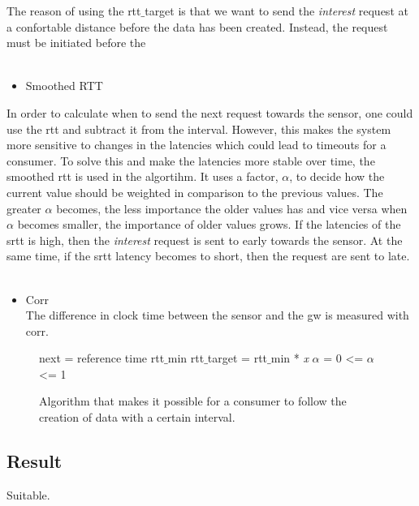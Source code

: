 The reason of using the rtt$\_$target is that we want to send the \textit{interest} request at a confortable distance before the data has been created.
Instead, the request must be initiated before the\\\\
\begin{itemize}
\item Smoothed RTT
\end{itemize}
In order to calculate when to send the next request towards the sensor, one could use the rtt and subtract it from the interval. 
However, this makes the system more sensitive to changes in the latencies which could lead to timeouts for a consumer. To solve this and make the latencies more stable over time, the smoothed rtt is used in the algortihm. It uses a factor, $\alpha$, to decide how the current value should be weighted in comparison to the previous values. The greater $\alpha$ becomes, the less importance the older values has and vice versa when $\alpha$ becomes smaller, the importance of older values grows.
If the latencies of the srtt is high, then the \textit{interest} request is sent to early towards the sensor. At the same time, if the srtt latency becomes to short, then the request are sent to late.\\\\
\begin{itemize}
\item Corr \\
	The difference in clock time between the sensor and the gw is measured with corr.
\end{itemize}

   
\begin{figure}
\begin{algorithm}[H]
 next = reference time\;
 rtt$\_$min\;
 rtt$\_$target = rtt$\_$min * \textit{x}\;
 $\alpha$ = 0 <= $\alpha$ <= 1\;

\end{algorithm}
\caption{Algorithm that makes it possible for a consumer to follow the creation of data with a certain interval.}
    \label{fig:onetime}
\end{figure}


\subsection{Result}
Suitable.

